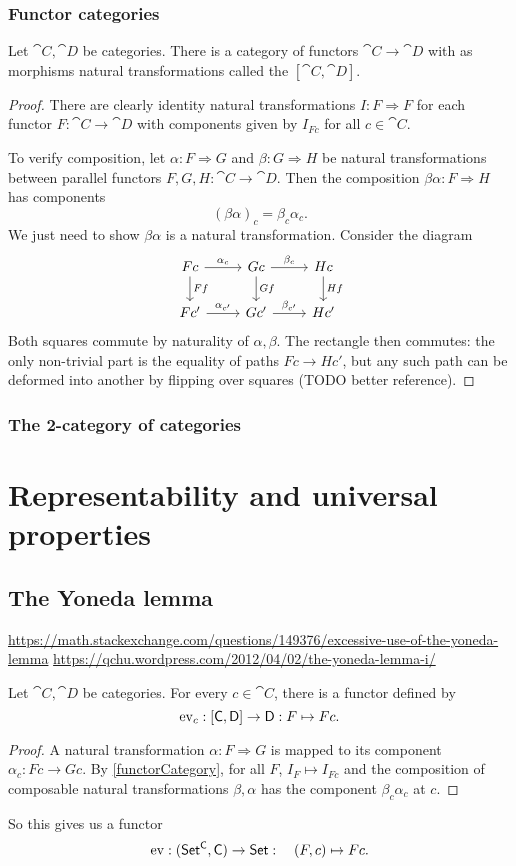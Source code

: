 \subsection{Functor categories}
\begin{proposition} \label{functorCategory}
Let $\cat{C}, \cat{D}$ be categories. There is a category of functors $\cat{C}\to \cat{D}$ with as morphisms natural transformations called the  $[\cat{C},\cat{D}]$.
\end{proposition}
\begin{proof}
There are clearly identity natural transformations $I:F\Rightarrow F$ for each functor $F: \cat{C}\to \cat{D}$ with components given by $I_{Fc}$ for all $c\in\cat{C}$.

To verify composition, let $\alpha: F \Rightarrow G$ and $\beta: G\Rightarrow H$ be natural transformations between parallel functors $F,G,H: \cat{C}\to \cat{D}$. Then the composition	$\beta\alpha: F\Rightarrow H$ has components
\[ (\beta\alpha)_c = \beta_c\alpha_c. \]
We just need to show $\beta\alpha$ is a natural transformation. Consider the diagram
\[ \begin{tikzcd}
Fc \ar[r, "\alpha_c"] \ar[d, "Ff"] & Gc \ar[d, "Gf"] \ar[r, "\beta_c"] & Hc \ar[d,"Hf"] \\
Fc' \ar[r, "{\alpha_{c'}}"] & Gc' \ar[r, "{\beta_{c'}}"] & Hc'
\end{tikzcd} \]
Both squares commute by naturality of $\alpha,\beta$. The rectangle then commutes: the only non-trivial part is the equality of paths $Fc\to Hc'$, but any such path can be deformed into another by flipping over squares (TODO better reference).
\end{proof}

\subsection{The 2-category of categories}


\chapter{Representability and universal properties}
\section{The Yoneda lemma}
\url{https://math.stackexchange.com/questions/149376/excessive-use-of-the-yoneda-lemma}
\url{https://qchu.wordpress.com/2012/04/02/the-yoneda-lemma-i/}
\begin{lemma}
Let $\cat{C},\cat{D}$ be categories. For every $c\in\cat{C}$, there is a functor defined by
\[ \operatorname{ev}_c: [\mathsf{C},\mathsf{D}] \to \mathsf{D}: F\mapsto Fc. \]
\end{lemma}
\begin{proof}
A natural transformation $\alpha: F \Rightarrow G$ is mapped to its component $\alpha_c: Fc \to Gc$. By \ref{functorCategory}, for all $F$, $I_F\mapsto I_{Fc}$ and the composition of composable natural transformations $\beta,\alpha$ has the component $\beta_c\alpha_c$ at $c$.
\end{proof}
So this gives us a functor
\[ \operatorname{ev}: (\mathsf{Set^C}, \mathsf{C}) \to \mathsf{Set}: \quad (F,c)\mapsto Fc.\]

